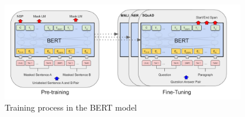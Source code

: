\documentclass[runningheads]{llncs}
\begin{document}
  \begin{figure}[]
    \centering
    \includegraphics[width=0.95\textwidth]{BERT Finetuning.png}
    \caption{Training process in the BERT model \cite{Devlin18}}
    \label{fig:bert_finetune}
  \end{figure}
\end{document}
